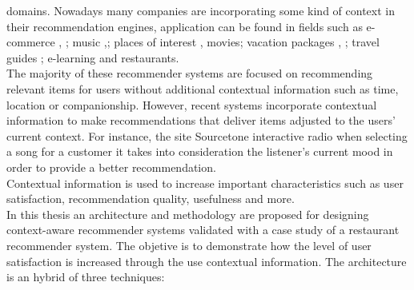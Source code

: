 domains. %
Nowadays many companies are incorporating some kind of
context in their recommendation engines, application can be found in fields
such as e-commerce \cite{schafer1999recommender}, \cite{bulander2005enabling};
music \cite{ricci2012context},\cite{baltrunas2011incarmusic}; 
places of interest \cite{baltrunas2012context},
movies\cite{eyjolfsdottir2010moviegen}; vacation packages \cite{liu2011personalized},
\cite{liu2014cocktail}; travel guides \cite{savage2012m}; e-learning\cite{ortigosa2010entornos} and restaurants\cite{chu2013chinese}.\\  
The majority of these recommender systems are focused on 
recommending relevant items for users without
additional contextual information such as time, location or %
companionship.  %
However, recent systems incorporate contextual
information to make recommendations that deliver items adjusted
to the users' current context. For instance, the site Sourcetone %
interactive radio \cite{huq2010automated} when selecting a song for
a customer it takes into consideration the listener's current mood in
order to provide a better recommendation. \\ Contextual information is used to
increase important characteristics such as user satisfaction, recommendation 
quality, usefulness and more.\\
In this thesis an architecture and methodology are proposed for designing context-aware
recommender systems validated with a case study of a restaurant recommender system. The objetive is to
demonstrate how the level of user satisfaction is increased through
the use contextual information. The architecture is an hybrid of three techniques:

